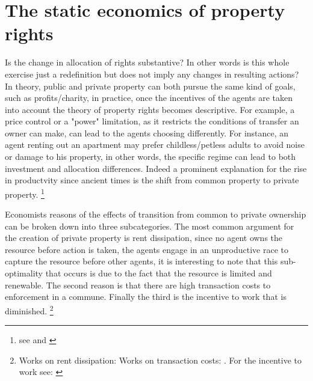 \documentclass[12pt]{article}
\numberwithin{equation}{section}
\begin{document}
\section{The static economics of property rights}

Is the change in allocation of rights substantive? In other words is this whole exercise just a redefinition but does not imply any changes in resulting actions? In theory, public and private property can both pursue the same kind of goals, such as profits/charity, in practice, once the incentives of the agents are taken into account the theory of property rights becomes descriptive. For example, a price control or a "power" limitation, as it restricts the conditions of transfer an owner can make, can lead to the agents choosing differently. For instance, an agent renting out an apartment may prefer childless/petless adults to avoid noise or damage to his property, in other words, the specific regime can lead to both investment and allocation differences. Indeed a prominent explanation for the rise in productvity since ancient times is the shift from common property to private property. \footnote{see \cite{anderson1983privatizing} and \cite{north1973rise}}

Economists reasons of the effects of transition from common to private ownership can be broken down into three subcategories. The most common argument for the creation of private property is rent dissipation, since no agent owns the resource before action is taken, the agents engage in an unproductive race to capture the  resource before other agents, it is interesting to note that this sub-optimality that occurs is due to the fact that the resource is limited and renewable. The second reason is that there are high transaction costs to enforcement in a commune. Finally the third is the incentive to work that is diminished.  \footnote{ Works on rent dissipation:\cite{dasgupta1979economic} \cite{gordon1954economic} \cite{Cheung1970} \cite{schaefer1957some} \cite{scott1955fishery} \cite{clark1990optimal} Works on transaction costs: \cite{coase1960problem} \cite{demsetz1983structure}. For the incentive to work see: \cite{north1990} }
\end{document}
